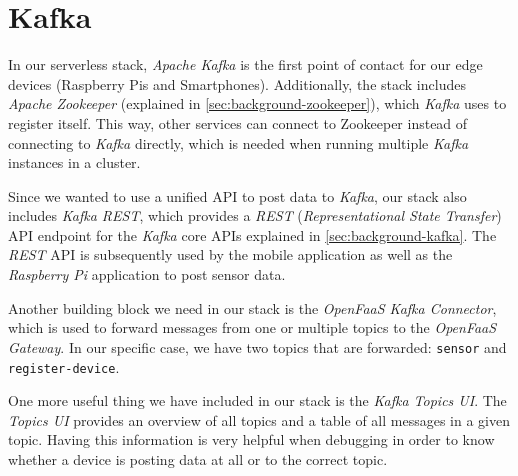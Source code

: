 \section{Kafka}

In our serverless stack, \textit{Apache Kafka} is the first point of contact for our edge devices
(Raspberry Pis and Smartphones). Additionally, the stack includes \textit{Apache Zookeeper}
(explained in \autoref{sec:background-zookeeper}), which \textit{Kafka} uses to register itself.
This way, other services can connect to Zookeeper instead of connecting to \textit{Kafka} directly, which is
needed when running multiple \textit{Kafka} instances in a cluster.

Since we wanted to use a unified API to post data to \textit{Kafka}, our stack also includes
\textit{Kafka REST}, which provides a \textit{REST} (\textit{Representational State Transfer}) API
endpoint for the \textit{Kafka} core APIs explained in \autoref{sec:background-kafka}. The
\textit{REST} API is subsequently used by the mobile application as well as the \textit{Raspberry Pi}
application to post sensor data.

Another building block we need in our stack is the \textit{OpenFaaS Kafka Connector}, which is used
to forward messages from one or multiple topics to the \textit{OpenFaaS Gateway}. In our specific
case, we have two topics that are forwarded: \texttt{sensor} and \texttt{register-device}.

One more useful thing we have included in our stack is the \textit{Kafka Topics UI}. The
\textit{Topics UI} provides an overview of all topics and a table of all messages in a given topic.
Having this information is very helpful when debugging in order to know whether a device is posting
data at all or to the correct topic.
